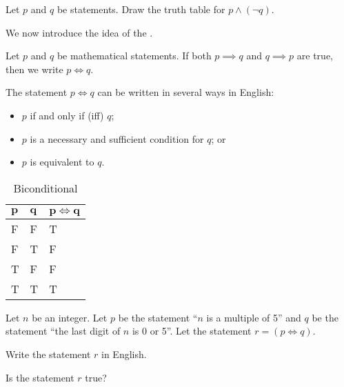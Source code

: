 \begin{exercise}\label{exercise-negation-of-implication}
    Let $p$ and $q$ be statements. Draw the truth table for $p \land (\lnot q)$.
\end{exercise}

We now introduce the idea of the .
\begin{definition}
    Let $p$ and $q$ be mathematical statements. If both $p \implies q$ and $q \implies p$ are true, then we write $p \iff q$.
\end{definition}
\begin{remark}
    The statement $p \iff q$ can be written in several ways in English:
    \begin{itemize}
        \item $p$ if and only if (iff) $q$;
        \item $p$ is a necessary and sufficient condition for $q$; or
        \item $p$ is equivalent to $q$.
    \end{itemize}
\end{remark}

\begin{table}[h]
    \centering
    \begin{tabular}{|l|l||l|}
        \hline
        $\boldsymbol{p}$ & $\boldsymbol{q}$ & $\boldsymbol{p \iff q}$ \\ \hline
        F   & F   & T         \\ \hline
        F   & T   & F         \\ \hline
        T   & F   & F         \\ \hline
        T   & T   & T         \\ \hline
    \end{tabular}
    \caption{Biconditional}
\end{table}

\begin{exercise}
    Let $n$ be an integer. Let $p$ be the statement ``$n$ is a multiple of 5'' and $q$ be the statement ``the last digit of $n$ is 0 or 5''. Let the statement $r = (p \iff q)$.
    \begin{partquestions}{\roman*}
        \item Write the statement $r$ in English.
        \item Is the statement $r$ true?
    \end{partquestions}
\end{exercise}

